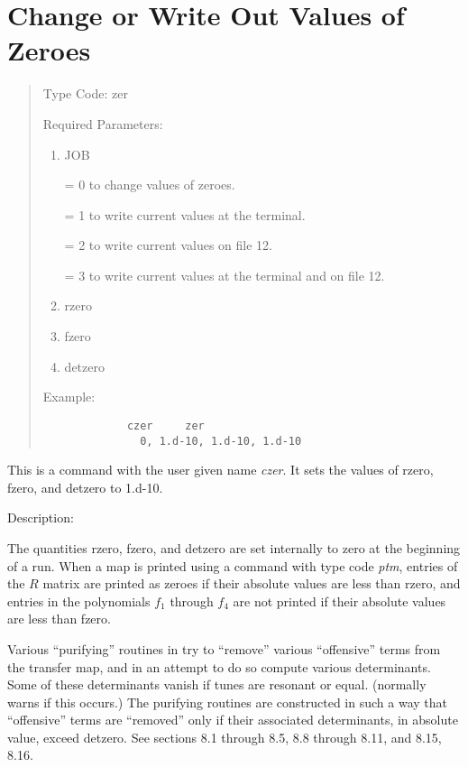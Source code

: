 \newpage
\section{Change or Write Out Values of Zeroes}
\begin{quotation}
\noindent Type Code:  zer 
\vspace{5mm}

\noindent Required Parameters:
\begin{enumerate}
      \item  JOB

             = 0 to change values of zeroes.

             = 1 to write current values at the terminal.

             = 2 to write current values on file 12.

             = 3 to write current values at the terminal and on file 12.
	  \item  rzero
      \item  fzero
      \item  detzero
\end{enumerate}

\vspace{5mm}
\noindent Example:
\begin{verbatim}
             czer     zer
               0, 1.d-10, 1.d-10, 1.d-10
\end{verbatim}
\end{quotation}

               This is a command with the user given name {\em czer}.  It sets  the values of rzero, fzero, and detzero to 1.d-10.

\vspace{5mm}
     Description:
\vspace{2mm}

The quantities rzero, fzero, and detzero are set internally to zero at the beginning of a \Mary run.  When a map is printed using a command with type code {\em ptm}, entries of the $R$ matrix are printed as zeroes if their absolute values are less than rzero, and entries in the polynomials $f_1$ through $f_4$ are not printed if their absolute values are less than fzero.

Various ``purifying'' routines in \Mary try to ``remove'' various ``offensive'' terms from the transfer map, and in an attempt to do so compute various determinants.  Some of these determinants vanish if tunes are resonant or equal.  (\Mary normally warns if this occurs.)  The purifying routines are constructed in such a way that ``offensive'' terms are ``removed'' only if their associated determinants, in absolute value, exceed detzero.  See sections 8.1 through 8.5, 8.8 through 8.11, and 8.15, 8.16.


